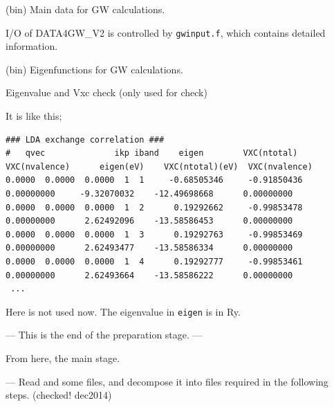 



\outfiles

 (bin) Main data for GW calculations. 

I/O of {\sf DATA4GW\_V2} is controlled by {\tt gwinput.f}, which 
contains detailed information.

 (bin) Eigenfunctions for GW calculations.

 Eigenvalue and Vxc check (only used for check)

It is like this;
{\baselineskip=2.8mm \scriptsize
\begin{verbatim}
### LDA exchange correlation ###
#   qvec              ikp iband    eigen        VXC(ntotal)    VXC(nvalence)      eigen(eV)    VXC(ntotal)(eV)  VXC(nvalence)
0.0000  0.0000  0.0000  1  1     -0.68505346     -0.91850436      0.00000000     -9.32070032    -12.49698668      0.00000000
0.0000  0.0000  0.0000  1  2      0.19292662     -0.99853478      0.00000000      2.62492096    -13.58586453      0.00000000
0.0000  0.0000  0.0000  1  3      0.19292763     -0.99853469      0.00000000      2.62493477    -13.58586334      0.00000000
0.0000  0.0000  0.0000  1  4      0.19292777     -0.99853461      0.00000000      2.62493664    -13.58586222      0.00000000
 ...
\end{verbatim}}
\noindent Here  is not used now. The eigenvalue in {\tt eigen} is in Ry.
\vspace{.5cm}

\begin{center}
--- This is the end of the preparation stage. ---
\end{center}
\vspace{.5cm}


\noindent From here, the main stage.

--- Read  and some files, and decompose it into files required in
  the following \GW steps.  (checked! dec2014)

\infiles

